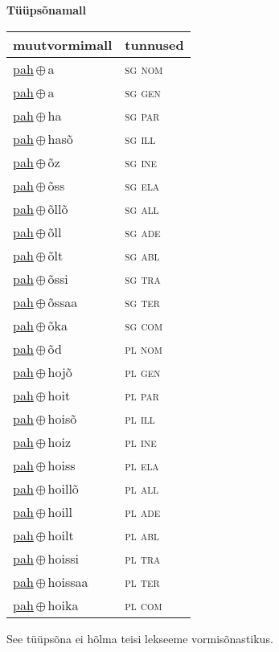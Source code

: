 

\vspace{3.5em}
\noindent \begin{minipage}{\textwidth}
\noindent \textbf{Tüüpsõnamall \,}\\

\begin{sideways}
\begin{tabular}{l l}
muutvormimall & tunnused \\
\hline
\underline{pah}\,$\oplus$\,a & \textsc{ sg nom } \\
\underline{pah}\,$\oplus$\,a & \textsc{ sg gen } \\
\underline{pah}\,$\oplus$\,ha & \textsc{ sg par } \\
\underline{pah}\,$\oplus$\,hasõ & \textsc{ sg ill } \\
\underline{pah}\,$\oplus$\,õz & \textsc{ sg ine } \\
\underline{pah}\,$\oplus$\,õss & \textsc{ sg ela } \\
\underline{pah}\,$\oplus$\,õllõ & \textsc{ sg all } \\
\underline{pah}\,$\oplus$\,õll & \textsc{ sg ade } \\
\underline{pah}\,$\oplus$\,õlt & \textsc{ sg abl } \\
\underline{pah}\,$\oplus$\,õssi & \textsc{ sg tra } \\
\underline{pah}\,$\oplus$\,õssaa & \textsc{ sg ter } \\
\underline{pah}\,$\oplus$\,õka & \textsc{ sg com } \\
\underline{pah}\,$\oplus$\,õd & \textsc{ pl nom } \\
\underline{pah}\,$\oplus$\,hojõ & \textsc{ pl gen } \\
\underline{pah}\,$\oplus$\,hoit & \textsc{ pl par } \\
\underline{pah}\,$\oplus$\,hoisõ & \textsc{ pl ill } \\
\underline{pah}\,$\oplus$\,hoiz & \textsc{ pl ine } \\
\underline{pah}\,$\oplus$\,hoiss & \textsc{ pl ela } \\
\underline{pah}\,$\oplus$\,hoillõ & \textsc{ pl all } \\
\underline{pah}\,$\oplus$\,hoill & \textsc{ pl ade } \\
\underline{pah}\,$\oplus$\,hoilt & \textsc{ pl abl } \\
\underline{pah}\,$\oplus$\,hoissi & \textsc{ pl tra } \\
\underline{pah}\,$\oplus$\,hoissaa & \textsc{ pl ter } \\
\underline{pah}\,$\oplus$\,hoika & \textsc{ pl com } \\
\end{tabular}
\end{sideways}
\label{tab:tüüpsõnamall-paha}

\end{minipage}

 
\vspace{1em}
\noindent See tüüpsõna ei hõlma teisi lekseeme vormi\-sõnastikus.
